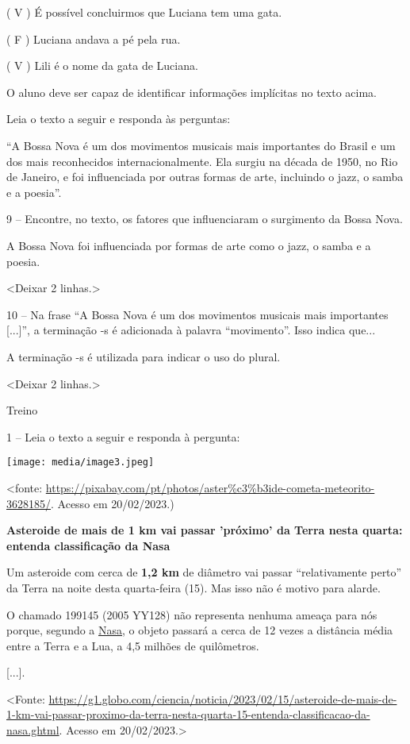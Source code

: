( V ) É possível concluirmos que Luciana tem uma gata.

( F ) Luciana andava a pé pela rua.

( V ) Lili é o nome da gata de Luciana.

O aluno deve ser capaz de identificar informações implícitas no texto
acima.

Leia o texto a seguir e responda às perguntas:

``A Bossa Nova é um dos movimentos musicais mais importantes do Brasil e
um dos mais reconhecidos internacionalmente. Ela surgiu na década de
1950, no Rio de Janeiro, e foi influenciada por outras formas de arte,
incluindo o jazz, o samba e a poesia''.

9 -- Encontre, no texto, os fatores que influenciaram o surgimento da
Bossa Nova.

A Bossa Nova foi influenciada por formas de arte como o jazz, o samba e
a poesia.

\textless{}Deixar 2 linhas.\textgreater{}

10 -- Na frase ``A Bossa Nova é um dos movimentos musicais mais
importantes {[}...{]}'', a terminação -s é adicionada à palavra
``movimento''. Isso indica que...

A terminação -s é utilizada para indicar o uso do plural.

\textless{}Deixar 2 linhas.\textgreater{}

Treino

1 -- Leia o texto a seguir e responda à pergunta:

\texttt{[image: media/image3.jpeg]}

\textless{}fonte:
\url{https://pixabay.com/pt/photos/aster\%c3\%b3ide-cometa-meteorito-3628185/}.
Acesso em 20/02/2023.)

\textbf{Asteroide de mais de 1 km vai passar 'próximo' da Terra nesta
quarta: entenda classificação da Nasa}

Um asteroide com cerca de \textbf{1,2 km} de diâmetro vai passar
``relativamente perto'' da Terra na noite desta quarta-feira (15). Mas
isso não é motivo para alarde.

O chamado 199145 (2005 YY128) não representa nenhuma ameaça para nós
porque, segundo a \href{https://g1.globo.com/tudo-sobre/nasa/}{Nasa}, o
objeto passará a cerca de 12 vezes a distância média entre a Terra e a
Lua, a 4,5 milhões de quilômetros.

{[}...{]}.

\textless{}Fonte:
\url{https://g1.globo.com/ciencia/noticia/2023/02/15/asteroide-de-mais-de-1-km-vai-passar-proximo-da-terra-nesta-quarta-15-entenda-classificacao-da-nasa.ghtml}.
Acesso em 20/02/2023.\textgreater{}

